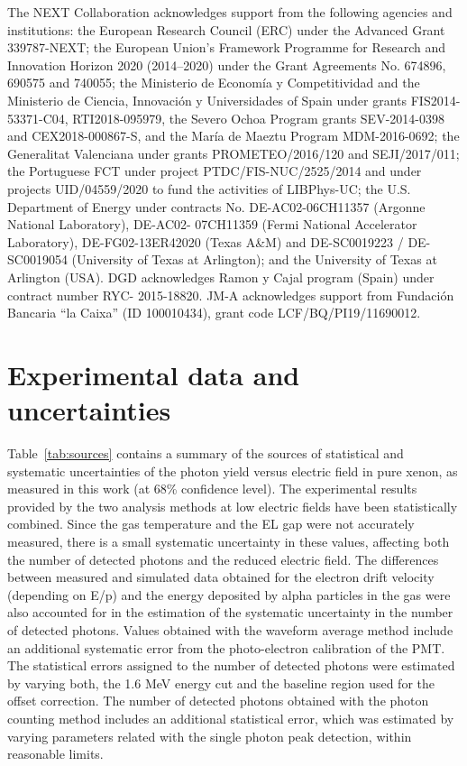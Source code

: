 \documentclass[%
 reprint,
superscriptaddress,
 amsmath,amssymb,
 aps,
]{revtex4-2}
\begin{document}
\begin{acknowledgments}
The NEXT Collaboration acknowledges support from the following agencies and institutions: the European Research Council (ERC) under the Advanced Grant 339787-NEXT; the European Union’s Framework Programme for Research and Innovation Horizon 2020 (2014–2020) under the Grant Agreements No. 674896, 690575 and 740055; the Ministerio de Econom\'ia y Competitividad and the Ministerio de Ciencia, Innovaci\'on y Universidades of Spain under grants FIS2014-53371-C04, RTI2018-095979, the Severo Ochoa Program grants SEV-2014-0398 and CEX2018-000867-S, and the Mar\'ia de Maeztu Program MDM-2016-0692; the Generalitat Valenciana under grants PROMETEO/2016/120 and SEJI/2017/011; the Portuguese FCT under project PTDC/FIS-NUC/2525/2014 and under projects UID/04559/2020 to fund the activities of LIBPhys-UC; the U.S. Department of Energy under contracts No. DE-AC02-06CH11357 (Argonne National Laboratory), DE-AC02- 07CH11359 (Fermi National Accelerator Laboratory), DE-FG02-13ER42020 (Texas A\&M) and DE-SC0019223 / DE-SC0019054 (University of Texas at Arlington); and the University of Texas at Arlington (USA). DGD acknowledges Ramon y Cajal program (Spain) under contract number RYC- 2015-18820. JM-A acknowledges support from Fundaci\'on Bancaria “la Caixa” (ID 100010434), grant code LCF/BQ/PI19/11690012. 
\end{acknowledgments}


\appendix

\section{\label{sec:values}Experimental data and uncertainties}

Table~\ref{tab:sources} contains a summary of the sources of statistical and systematic uncertainties of the photon yield versus electric field in pure xenon, as measured in this work (at 68\% confidence level). The experimental results provided by the two analysis methods at low electric fields have been statistically combined. Since the gas temperature and the EL gap were not accurately measured, there is a small systematic uncertainty in these values, affecting both the number of detected photons and the reduced electric field. The differences between measured and simulated data obtained for the electron drift velocity (depending on E/p) and the energy deposited by alpha particles in the gas were also accounted for in the estimation of the systematic uncertainty in the number of detected photons. Values obtained with the waveform average method include an additional systematic error from the photo-electron calibration of the PMT.
The statistical errors assigned to the number of detected photons were estimated by varying  both, the 1.6 MeV energy cut and the baseline region used for the offset correction. The number of detected photons obtained with the photon counting method includes an additional statistical error, which was estimated by varying parameters related with the single photon peak detection, within reasonable limits.    
\end{document}
